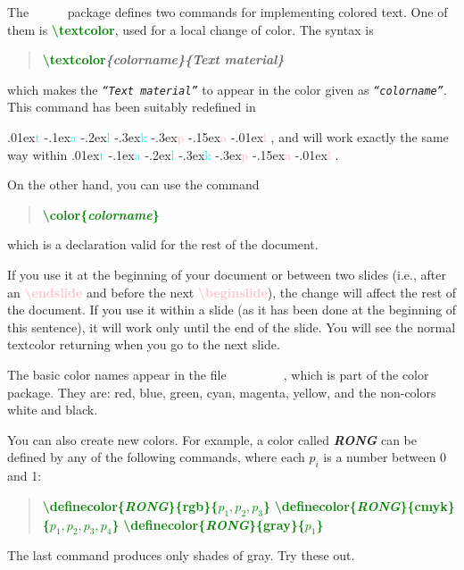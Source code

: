 \documentclass[12pt]{article}
\def\emph#1{\textcolor{leaf}{#1}}
\def\talkpal{
\raise.01ex\hbox{\textcolor{cyan}{t}}%
\raise-.1ex\hbox{\textcolor{cyan}{a}}%
\raise-.2ex\hbox{\textcolor{cyan}{l}}%
\raise-.3ex\hbox{\textcolor{cyan}{k}}%
\raise-.3ex\hbox{\textcolor{pink}{p}}%
\raise-.15ex\hbox{\textcolor{pink}{a}}%
\raise-.01ex\hbox{\textcolor{pink}{l}}%
}
\def\commcolor{pink}
\def\ecomm#1{\textcolor{green}{\bf \textbackslash#1}}
\def\comm#1{\textcolor{\commcolor}{\bf \textbackslash#1}}
\def\var#1{\textcolor{lightmagenta}{\bf{\em #1}}}
\def\file#1{\textcolor{white}{\bf #1}}
\def\txtem#1{\texttt{\sl `#1'}}
\def\section#1{
\fcolorbox{leaf}{red}{
  \textcolor{white}{\Huge #1\vphantom{y}}}}
\newenvironment{Quote}{\vspace{-5mm}\begin{quote}}{\end{quote}\vspace{-5mm}}
\begin{document}
\newsegment

The \file{color} package defines two commands for implementing colored
text.  One of them is \ecomm{textcolor}, used for a local change of
color.  The syntax is
%
\begin{Quote}
\ecomm{textcolor}\var{\{{colorname}\}\{Text material\}}
\end{Quote}
%
which makes the \txtem{`Text material'} to appear in the color given
as \txtem{`colorname'}.  This command has been suitably redefined in
\talkpal, and will work exactly the same way within \talkpal.

\endslide


\beginslide

On the other hand, you can use the command
%
\begin{Quote}
\ecomm{color\{\var{colorname}\}}
\end{Quote}
%
which is a declaration valid for the rest of the document.

If you use it at the beginning of your document or between two slides
(i.e., after an \comm{endslide} and before the next \comm{beginslide}),
the change will affect the rest of the document. \color{white} If you
use it within a slide (as it has been done at the beginning of this
sentence), it will work only until the end of the slide.  You will see
the normal textcolor returning when you go to the next slide.


\endslide


\beginslide

\section{Color names}

The basic color names appear in the file \file{color.sty}, which is part
of the color package.  They are: \emph{red, blue, green, cyan, magenta,
  yellow}, and the non-colors \emph{white and black}.

\newsegment

You can also create new colors.  For example, a color called \var{RONG}
can be defined by any of the following commands, where each $p_i$ is a
number between 0 and 1:
%
\begin{Quote}
\ecomm{definecolor\{\var{RONG}\}\{rgb\}\{\var{$p_1,p_2,p_3$}\}} 
\ecomm{definecolor\{\var{RONG}\}\{cmyk\}\{\var{$p_1,p_2,p_3,p_4$}\}}  
\ecomm{definecolor\{\var{RONG}\}\{gray\}\{\var{$p_1$}\}}
\label{p:newcolors}
\end{Quote} 
%
The last command produces only shades of gray.  Try these out.\label{p:endblue}
\end{document}
